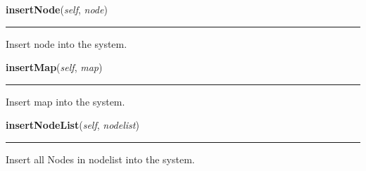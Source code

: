     \vspace{0.5ex}

    \begin{boxedminipage}{\textwidth}

    \raggedright \textbf{insertNode}(\textit{self}, \textit{node})

    \vspace{-1.5ex}

    \rule{\textwidth}{0.5\fboxrule}
    Insert node into the system.

    \vspace{1ex}

    \end{boxedminipage}

    \label{Epigrass:dgraph:Graph:insertMap}

    \vspace{0.5ex}

    \begin{boxedminipage}{\textwidth}

    \raggedright \textbf{insertMap}(\textit{self}, \textit{map})

    \vspace{-1.5ex}

    \rule{\textwidth}{0.5\fboxrule}
    Insert map into the system.

    \vspace{1ex}

    \end{boxedminipage}

    \label{Epigrass:dgraph:Graph:insertNodeList}

    \vspace{0.5ex}

    \begin{boxedminipage}{\textwidth}

    \raggedright \textbf{insertNodeList}(\textit{self}, \textit{nodelist})

    \vspace{-1.5ex}

    \rule{\textwidth}{0.5\fboxrule}
    Insert all Nodes in nodelist into the system.

    \vspace{1ex}

    \end{boxedminipage}


